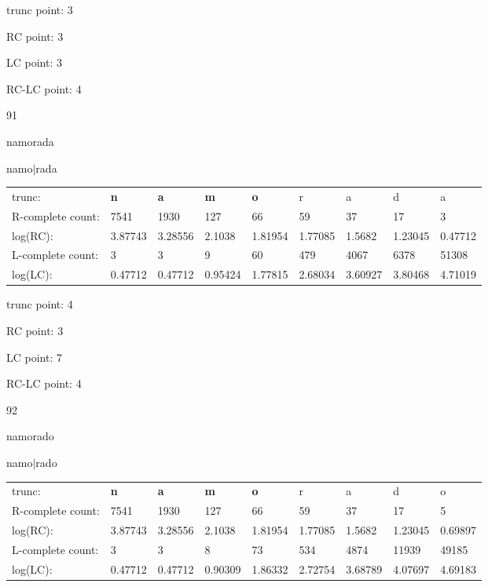\documentclass{article}
\begin{document}
trunc point: 3

RC point: 3

LC point: 3

RC-LC point: 4

\vspace{3em}



91

namorada

namo$|$rada

\vspace{1em}

\begin{tabular}{l|llllllll}

trunc: & {\color{red}\bf n} & {\color{red}\bf a} & {\color{red}\bf m} & {\color{red}\bf o} & r & a & d & a \\ 
R-complete count: & 7541 & 1930 & 127 & 66 & 59 & 37 & 17 & 3 \\ 
log(RC): & 3.87743 & 3.28556 & 2.1038 & 1.81954 & 1.77085 & 1.5682 & 1.23045 & 0.47712 \\ 
L-complete count: & 3 & 3 & 9 & 60 & 479 & 4067 & 6378 & 51308 \\ 
log(LC): & 0.47712 & 0.47712 & 0.95424 & 1.77815 & 2.68034 & 3.60927 & 3.80468 & 4.71019 \\ 
\end{tabular}

trunc point: 4

RC point: 3

LC point: 7

RC-LC point: 4

\vspace{3em}



92

namorado

namo$|$rado

\vspace{1em}

\begin{tabular}{l|llllllll}

trunc: & {\color{red}\bf n} & {\color{red}\bf a} & {\color{red}\bf m} & {\color{red}\bf o} & r & a & d & o \\ 
R-complete count: & 7541 & 1930 & 127 & 66 & 59 & 37 & 17 & 5 \\ 
log(RC): & 3.87743 & 3.28556 & 2.1038 & 1.81954 & 1.77085 & 1.5682 & 1.23045 & 0.69897 \\ 
L-complete count: & 3 & 3 & 8 & 73 & 534 & 4874 & 11939 & 49185 \\ 
log(LC): & 0.47712 & 0.47712 & 0.90309 & 1.86332 & 2.72754 & 3.68789 & 4.07697 & 4.69183 \\ 
\end{tabular}
\end{document}
